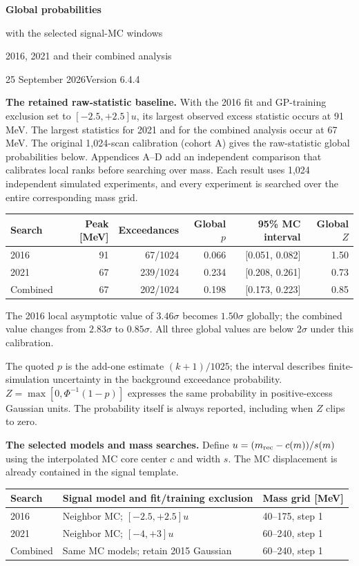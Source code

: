 \documentclass[11pt]{article}
\begin{document}
{\LARGE\bfseries Global probabilities\par with the selected signal-MC windows}\par
{\large 2016, 2021 and their combined analysis}\par
25 September 2026\hfill Version 6.4.4

\textbf{The retained raw-statistic baseline.} With the 2016 fit and GP-training exclusion set to $[-2.5,+2.5]u$, its largest observed excess statistic occurs at 91 MeV. The largest statistics for 2021 and for the combined analysis occur at 67 MeV. The original 1,024-scan calibration (cohort A) gives the raw-statistic global probabilities below. Appendices A--D add an independent comparison that calibrates local ranks before searching over mass. Each result uses 1,024 independent simulated experiments, and every experiment is searched over the entire corresponding mass grid.

\begin{center}\small\begin{tabular}{lrrrrr}\toprule
Search & Peak [MeV] & Exceedances & Global $p$ & 95\% MC interval & Global $Z$\\\midrule
2016 & 91 & 67/1024 & 0.066 & [0.051, 0.082] & 1.50\\
2021 & 67 & 239/1024 & 0.234 & [0.208, 0.261] & 0.73\\
Combined & 67 & 202/1024 & 0.198 & [0.173, 0.223] & 0.85\\
\bottomrule\end{tabular}\end{center}

The 2016 local asymptotic value of $3.46\sigma$ becomes $1.50\sigma$ globally; the combined value changes from $2.83\sigma$ to $0.85\sigma$. All three global values are below $2\sigma$ under this calibration.

The quoted $p$ is the add-one estimate $(k+1)/1025$; the interval describes finite-simulation uncertainty in the background exceedance probability. $Z=\max[0,\Phi^{-1}(1-p)]$ expresses the same probability in positive-excess Gaussian units. The probability itself is always reported, including when $Z$ clips to zero.

\textbf{The selected models and mass searches.} Define $u=(m_{\rm rec}-c(m))/s(m)$ using the interpolated MC core center $c$ and width $s$. The MC displacement is already contained in the signal template.

\begin{center}\small\begin{tabular}{lll}\toprule
Search & Signal model and fit/training exclusion & Mass grid [MeV]\\\midrule
2016 & Neighbor MC; $[-2.5,+2.5]u$ & 40--175, step 1\\
2021 & Neighbor MC; $[-4,+3]u$ & 60--240, step 1\\
Combined & Same MC models; retain 2015 Gaussian & 60--240, step 1\\\bottomrule
\end{tabular}\end{center}
\end{document}
